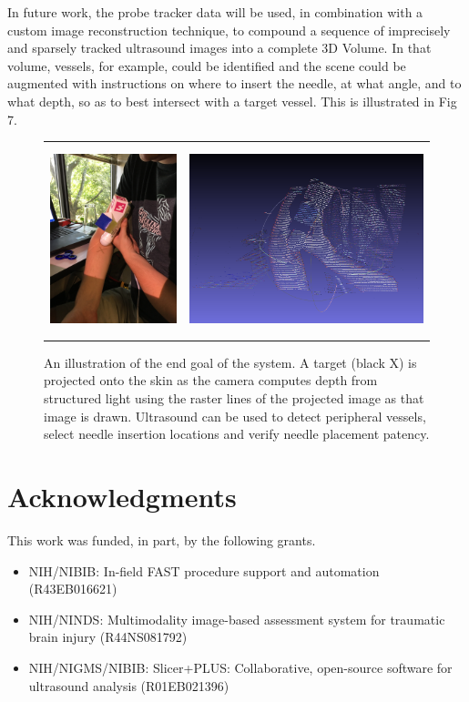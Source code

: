 \documentclass{llncs}
\begin{document}
In future work, the probe tracker data will be used, in combination with a custom image reconstruction technique, to compound a sequence of imprecisely and sparsely tracked ultrasound images into a complete 3D Volume.  In that volume, vessels, for example, could be identified and the scene could be augmented with instructions on where to insert the needle, at what angle, and to what depth, so as to best intersect with a target vessel.  This is illustrated in Fig 7.

\begin{figure}
\centering
\begin{tabular}{cc}
\centering
\includegraphics[height=5.5cm,keepaspectratio]{Hastings_arm} &
\includegraphics[height=5.5cm,keepaspectratio]{Hastings_arm_pointcloud}\\
\end{tabular}
\caption{An illustration of the end goal of the system. A target (black X) is projected onto the skin as the camera computes depth from structured light using the raster lines of the projected image as that image is drawn. Ultrasound can be used to detect peripheral vessels, select needle insertion locations and verify needle placement patency.
}
\end{figure}

\section*{Acknowledgments}
This work was funded, in part, by the following grants.
\begin{itemize}
	\item NIH/NIBIB: In-field FAST procedure support and automation (R43EB016621)
	\item NIH/NINDS: Multimodality image-based assessment system for traumatic brain injury (R44NS081792)
	\item NIH/NIGMS/NIBIB: Slicer+PLUS: Collaborative, open-source software for ultrasound analysis (R01EB021396)
\end{itemize}
\end{document}
